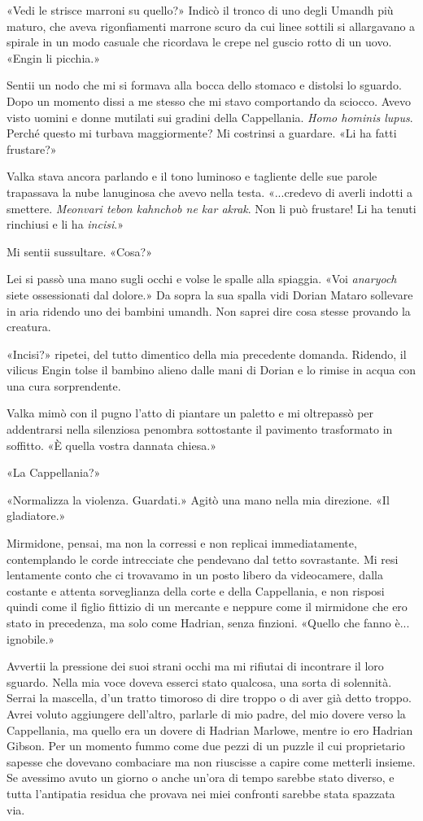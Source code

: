 «Vedi le strisce marroni su quello?» Indicò il tronco di uno degli
Umandh più maturo, che aveva rigonfiamenti marrone scuro da cui linee
sottili si allargavano a spirale in un modo casuale che ricordava le
crepe nel guscio rotto di un uovo. «Engin li picchia.»

Sentii un nodo che mi si formava alla bocca dello stomaco e distolsi lo
sguardo. Dopo un momento dissi a me stesso che mi stavo comportando da
sciocco. Avevo visto uomini e donne mutilati sui gradini della
Cappellania. \emph{Homo hominis lupus}. Perché questo mi turbava
maggiormente? Mi costrinsi a guardare. «Li ha fatti frustare?»

Valka stava ancora parlando e il tono luminoso e tagliente delle sue
parole trapassava la nube lanuginosa che avevo nella testa. «...credevo
di averli indotti a smettere. \emph{Meonvari tebon kahnchob ne kar
	akrak}. Non li può frustare! Li ha tenuti rinchiusi e li ha
\emph{incisi}.»

Mi sentii sussultare. «Cosa?»

Lei si passò una mano sugli occhi e volse le spalle alla spiaggia. «Voi
\emph{anaryoch} siete ossessionati dal dolore.» Da sopra la sua spalla
vidi Dorian Mataro sollevare in aria ridendo uno dei bambini umandh. Non
saprei dire cosa stesse provando la creatura.

«Incisi?» ripetei, del tutto dimentico della mia precedente domanda.
Ridendo, il vilicus Engin tolse il bambino alieno dalle mani di Dorian e
lo rimise in acqua con una cura sorprendente.

Valka mimò con il pugno l'atto di piantare un paletto e mi oltrepassò
per addentrarsi nella silenziosa penombra sottostante il pavimento
trasformato in soffitto. «È quella vostra dannata chiesa.»

«La Cappellania?»

«Normalizza la violenza. Guardati.» Agitò una mano nella mia direzione.
«Il gladiatore.»

Mirmidone, pensai, ma non la corressi e non replicai immediatamente,
contemplando le corde intrecciate che pendevano dal tetto sovrastante.
Mi resi lentamente conto che ci trovavamo in un posto libero da
videocamere, dalla costante e attenta sorveglianza della corte e della
Cappellania, e non risposi quindi come il figlio fittizio di un mercante
e neppure come il mirmidone che ero stato in precedenza, ma solo come
Hadrian, senza finzioni. «Quello che fanno è... ignobile.»

Avvertii la pressione dei suoi strani occhi ma mi rifiutai di incontrare
il loro sguardo. Nella mia voce doveva esserci stato qualcosa, una sorta
di solennità. Serrai la mascella, d'un tratto timoroso di dire troppo o
di aver già detto troppo. Avrei voluto aggiungere dell'altro, parlarle
di mio padre, del mio dovere verso la Cappellania, ma quello era un
dovere di Hadrian Marlowe, mentre io ero Hadrian Gibson. Per un momento
fummo come due pezzi di un puzzle il cui proprietario sapesse che
dovevano combaciare ma non riuscisse a capire come metterli insieme. Se
avessimo avuto un giorno o anche un'ora di tempo sarebbe stato diverso,
e tutta l'antipatia residua che provava nei miei confronti sarebbe stata
spazzata via.

